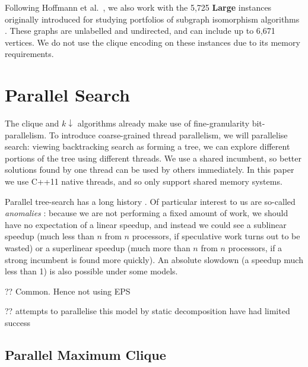 \documentclass{llncs}
\begin{document}
\noindent
Following Hoffmann et al.\ \cite{DBLP:conf/aaai/HoffmannMR17}, we also work with the 5,725 \textbf{Large} instances
originally introduced for studying portfolios of subgraph isomorphism algorithms
\cite{DBLP:conf/lion/KotthoffMS16}. These graphs are unlabelled and undirected, and can include up
to 6,671 vertices. We do not use the clique encoding on these instances due to its
memory requirements.

\section{Parallel Search}

The clique and $k{\downarrow}$ algorithms already make use of fine-granularity bit-parallelism. To
introduce coarse-grained thread parallelism, we will parallelise search: viewing backtracking search
as forming a tree, we can explore different portions of the tree using different threads. We use a
shared incumbent, so better solutions found by one thread can be used by others immediately. In this
paper we use C++11 native threads, and so only support shared memory systems.

Parallel tree-search has a long history \cite{o:BaderHC05}. Of particular interest to us are
so-called \emph{anomalies}
\cite{DBLP:journals/cacm/LaiS84,DBLP:journals/tc/LiW86,DBLP:conf/irregular/BruinKT95}: because we
are not performing a fixed amount of work, we should have no expectation of a linear speedup, and
instead we could see a sublinear speedup (much less than $n$ from $n$ processors, if speculative
work turns out to be wasted) or a superlinear speedup (much more than $n$ from $n$ processors, if a
strong incumbent is found more quickly). An absolute slowdown (a speedup much less than 1) is also
possible under some models.

?? Common. Hence not using EPS

?? attempts to parallelise this model by static decomposition have had limited success
\cite{DBLP:conf/ictai/MinotNS15}

\subsection{Parallel Maximum Clique}
\end{document}
